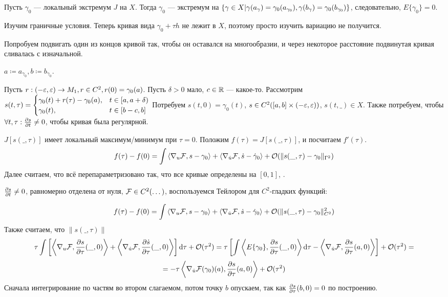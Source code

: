 \documentclass[a4paper]{article}
\begin{document}
    Пусть $\gamma_0$ --- локальный экстремум $J$ на $X$.
    Тогда $\gamma_0$ --- экстремум на $\left\{\gamma \in X\middle|\gamma(a_\gamma) = \gamma_0(a_{\gamma_0}), \gamma(b_\gamma) = \gamma_0(b_{\gamma_0})\right\}$, следовательно, $E\{\gamma_0\} = 0$.

    Изучим граничные условия.
    Теперь кривая вида $\gamma_0 + \tau h$ не лежит в $X$, поэтому просто изучить вариацию не получится.

    Попробуем подвигать один из концов кривой так, чтобы он оставался на многообразии, и через некоторое расстояние подвинутая кривая сливалась с изначальной.

    $a \coloneqq a_{\gamma_0}, b \coloneqq b_{\gamma_0}$.

    Пусть $r: (-\varepsilon, \varepsilon) \rightarrow M_1, r \in C^2, r(0) = \gamma_0(a)$.
    Пусть $\delta > 0$ мало, $c \in \mathbb{R}$ --- какое-то.
    Рассмотрим $s(t, \tau) = \begin{cases}\gamma_0(t) + r(\tau) - \gamma_0(a), & t \in [a, a + \delta) \\ \gamma_0(t),& t \in [b - c, b]\end{cases}$
    Потребуем $s(t, 0) = \gamma_0(t)$, $s \in C^2([a, b] \times (-\varepsilon, \varepsilon))$, $s(t, \_) \in X$.
    Также потребуем, чтобы $\forall t, \tau: \frac{\partial s}{\partial t} \ne 0$, чтобы кривая была регулярной.


    $J[s(\_, \tau)]$ имеет локальный максимум/минимум при $\tau = 0$.
    Положим $f(\tau) = J[s(\_, \tau)]$, и посчитаем $f'(\tau)$.
    \[f(\tau) - f(0) = \int\left\langle\nabla_u \mathcal{F}, s - \gamma_0\right\rangle + \left\langle\nabla_{\dot{u}}\mathcal{F}, \dot{s} - \dot{\gamma}_0\right\rangle + \mathcal{O}(\|s(\_, \tau) - \gamma_0\|_{\Gamma^2})\]
    Далее считаем, что всё перепараметризовано так, что все кривые определены на $[0, 1]$, . %
    
    $\frac{\partial s}{\partial t} \neq 0$, равномерно отделена от нуля, $\mathcal{F} \in C^2(\dots)$, воспользуемся Тейлором для $C^2$-гладких функций:
    
    \[f(\tau) - f(0) = \int\left\langle\nabla_u \mathcal{F}, s - \gamma_0\right\rangle + \left\langle\nabla_{\dot{u}}\mathcal{F}, \dot{s} - \dot{\gamma}_0\right\rangle + \mathcal{O}(\|s(\_, \tau) - \gamma_0\|^2_{C^2})\]
    Также считаем, что $\|s(\_, \tau)\|$  %
    \[\tau\int\left[\left\langle\nabla_u\mathcal{F}, \frac{\partial s}{\partial \tau}(\_, 0)\right\rangle + \left\langle\nabla_{\dot{u}}\mathcal{F}, \frac{\partial \dot s}{\partial \tau}(\_, 0)\right\rangle\right]\operatorname{d}\! \tau + \mathcal{O}(\tau^2) = \tau\left[\int\left\langle E\{\gamma_0\}, \frac{\partial s}{\partial \tau}(\_, 0)\right\rangle\operatorname{d}\! \tau - \left\langle\nabla_{\dot u} \mathcal{F}, \frac{\partial s}{\partial \tau}(a, 0)\right\rangle\right]  + \mathcal{O}(\tau^2) =\]
    \[= - \tau\left\langle\nabla_{\dot{u}}\mathcal{F}(\gamma_0)(a), \frac{\partial s}{\partial \tau}(a, 0)\right\rangle + \mathcal{O}(\tau^2)\]
    Сначала интегрирование по частям во втором слагаемом, потом точку $b$ опускаем, так как $\frac{\partial s}{\partial \tau}(b, 0) = 0$ по построению.
\end{document}
